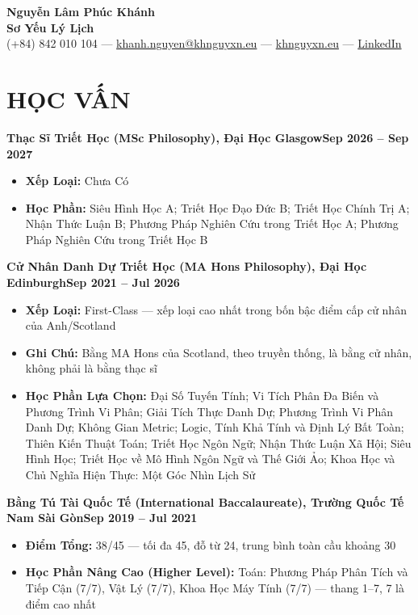 \documentclass[a4paper,9pt]{extarticle}
\newcommand{\cventry}[2]{\noindent\textbf{#1}\hfill\textbf{#2}\par}
\begin{document}
\pagestyle{empty}

\begin{center}
    \textbf{\Large Nguyễn Lâm Phúc Khánh}\\[3pt]
    \textbf{Sơ Yếu Lý Lịch}\\[1pt]
    (+84) 842 010 104 --- \href{mailto:khanh.nguyen@khnguyxn.eu}{khanh.nguyen@khnguyxn.eu} --- \href{https://khnguyxn.eu}{khnguyxn.eu} --- \href{https://www.linkedin.com/in/khanh-nguyen-3233563a4/}{LinkedIn}
\end{center}

\section*{HỌC VẤN}
    \cventry{Thạc Sĩ Triết Học (MSc Philosophy), Đại Học Glasgow}{Sep 2026 -- Sep 2027}
    \begin{itemize}
        \item \textbf{Xếp Loại:} Chưa Có
        \item \textbf{Học Phần:} Siêu Hình Học A; Triết Học Đạo Đức B; Triết Học Chính Trị A; Nhận Thức Luận B; Phương Pháp Nghiên Cứu trong Triết Học A; Phương Pháp Nghiên Cứu trong Triết Học B
    \end{itemize}

    \vspace{1em}
    \cventry{Cử Nhân Danh Dự Triết Học (MA Hons Philosophy), Đại Học Edinburgh}{Sep 2021 -- Jul 2026}
    \begin{itemize}
        \item \textbf{Xếp Loại:} First-Class --- xếp loại cao nhất trong bốn bậc điểm cấp cử nhân của Anh/Scotland
        \item \textbf{Ghi Chú:} Bằng MA Hons của Scotland, theo truyền thống, là bằng cử nhân, không phải là bằng thạc sĩ
        \item \textbf{Học Phần Lựa Chọn:} Đại Số Tuyến Tính; Vi Tích Phân Đa Biến và Phương Trình Vi Phân; Giải Tích Thực Danh Dự; Phương Trình Vi Phân Danh Dự; Không Gian Metric; Logic, Tính Khả Tính và Định Lý Bất Toàn; Thiên Kiến Thuật Toán; Triết Học Ngôn Ngữ; Nhận Thức Luận Xã Hội; Siêu Hình Học; Triết Học về Mô Hình Ngôn Ngữ và Thế Giới Ảo; Khoa Học và Chủ Nghĩa Hiện Thực: Một Góc Nhìn Lịch Sử
    \end{itemize}

    \vspace{1em}
    \cventry{Bằng Tú Tài Quốc Tế (International Baccalaureate), Trường Quốc Tế Nam Sài Gòn}{Sep 2019 -- Jul 2021}
    \begin{itemize}
        \item \textbf{Điểm Tổng:} 38/45 --- tối đa 45, đỗ từ 24, trung bình toàn cầu khoảng 30
        \item \textbf{Học Phần Nâng Cao (Higher Level):} Toán: Phương Pháp Phân Tích và Tiếp Cận (7/7), Vật Lý (7/7), Khoa Học Máy Tính (7/7) --- thang 1--7, 7 là điểm cao nhất
    \end{itemize}
\end{document}
